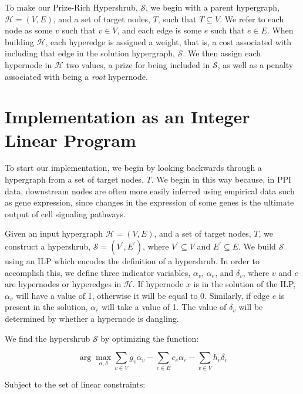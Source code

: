 \documentclass[12pt,twoside]{reedthesis}
\theoremstyle{definition}
\newcommand{\argmax}{\arg\!\max}
\begin{document}
To make our Prize-Rich Hypershrub, $\mathcal{S}$, we begin with a parent hypergraph, $\mathcal{H} = (V,E)$, and a set of target nodes, $T$, such that $T \subseteq V$.  We refer to each node as some $v$ such that $v \in V$, and each edge is some $e$ such that $e \in E$.  When building $\mathcal{H}$, each hyperedge is assigned a weight, that is, a cost associated with including that edge in the solution hypergraph, $\mathcal{S}$.  We then assign each hypernode in $\mathcal{H}$ two values, a prize for being included in $\mathcal{S}$, as well as a penalty associated with being a \textit{root} hypernode.\par

\section{Implementation as an Integer Linear Program}

To start our implementation, we begin by looking backwards through a hypergraph from a set of target nodes, $T$. We begin in this way because, in PPI data, downstream nodes are often more easily inferred using empirical data such as gene expression, since changes in the expression of some genes is the ultimate output of cell signaling pathways.

Given an input hypergraph $\mathcal{H}=(V,E)$, and a set of target nodes, $T$, we construct a hypershrub, $\mathcal{S}= (V^\prime,E^\prime)$, where $V^\prime \subseteq V$ and $E^\prime \subseteq E$.  We build $\mathcal{S}$ using an ILP which encodes the definition of a hypershrub.  In order to accomplish this, we define three indicator variables, $\alpha_v$, $\alpha_e$, and $\delta_v$, where $v$ and $e$ are hypernodes or hyperedges in $\mathcal{H}$.  If hypernode $x$ is in the solution of the ILP, $\alpha_v$ will have a value of 1, otherwise it will be equal to 0.  Similarly, if edge $e$ is present in the solution, $\alpha_e$ will take a value of 1. The value of $\delta_v$ will be determined by whether a hypernode is dangling.\par

We find the hypershrub $\mathcal{S}$ by optimizing the function:

\begin{equation} \label{eq:ilpsum}
 \argmax_{\alpha, \delta} \sum_{v \in V} g_v \alpha_v - \sum_{e \in E} c_e \alpha_e - \sum_{v \in V} h_v \delta_v
\end{equation}

Subject to the set of linear constraints:
\end{document}
